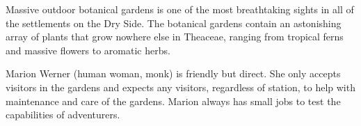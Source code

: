 Massive outdoor botanical gardens is one of the most breathtaking sights in all of the settlements on the Dry Side.
The botanical gardens contain an astonishing array of plants that grow nowhere else in Theaceae, ranging from tropical ferns and massive flowers to aromatic herbs.

Marion Werner (human woman, monk) is friendly but direct.
She only accepts visitors in the gardens and expects any visitors, regardless of station, to help with maintenance and care of the gardens.
Marion always has small jobs to test the capabilities of adventurers.

